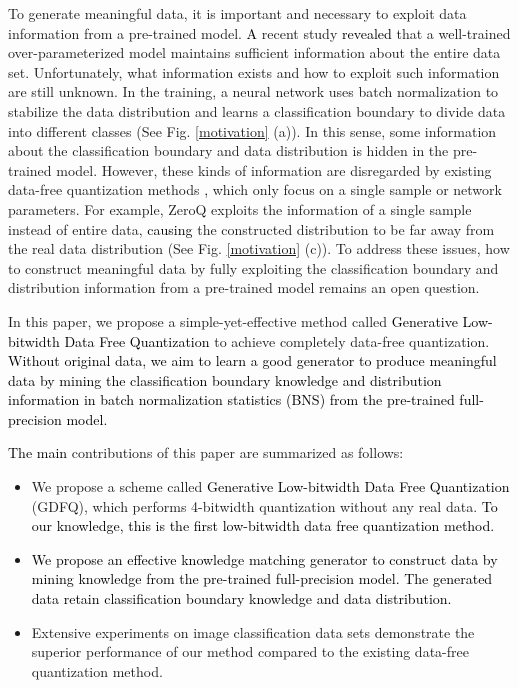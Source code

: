\documentclass[runningheads]{llncs}
\def\mytitle{\textcolor{black}{Generative Low-bitwidth Data Free Quantization }}
\def\jie{\textcolor{black}}
\def\new{\textcolor{black}}
\begin{document}
To generate meaningful data, it is important and necessary to exploit data information from a pre-trained model.
\new{A} recent study \cite{zhang2016understanding} \new{revealed} that a well-trained over-parameterized model maintains sufficient information about the entire data set.
Unfortunately, what information exists and how to exploit such information are still unknown.
In the training, a neural network uses batch normalization \cite{ioffe2015batch} to stabilize the data distribution and learns a classification boundary to divide data into different classes (See Fig. \ref{motivation} (a)).
In this sense, some information about the classification boundary and data distribution is hidden in the pre-trained model.
However, these kinds of information are disregarded by existing data-free quantization methods \cite{Cai_2020_CVPR,nagel2019data}\new{,} which only focus on a single sample or network parameters.
For example, ZeroQ \cite{Cai_2020_CVPR} exploits the information of a single sample instead of entire data, \new{causing} the constructed distribution to be far away from the real data distribution (See Fig. \ref{motivation} (c)).
To address these issues, how to construct meaningful data by fully exploiting the classification boundary and distribution information from a pre-trained model remains an open question.

In this paper, we propose a simple-yet-effective method called \mytitle to achieve completely data-free quantization.
\jie{Without original data, we aim to learn a good generator to produce meaningful data by mining the classification boundary knowledge and distribution information in batch normalization statistics (BNS) from the pre-trained full-precision model.}


\new{The main} contributions of this paper are summarized as follows: 

\begin{itemize}

\item We propose a scheme called \mytitle (GDFQ), which performs 4-bitwidth quantization without any real data. \new{To our knowledge, this is the first low-bitwidth data free quantization method.}

\item \jie{We propose an effective knowledge matching generator to construct data by mining knowledge from the pre-trained full-precision model. 
The generated data retain classification boundary knowledge and data distribution.
}

\item Extensive experiments on image classification data sets demonstrate the superior performance of our method compared to the existing data-free quantization method.
\end{itemize}
\end{document}
